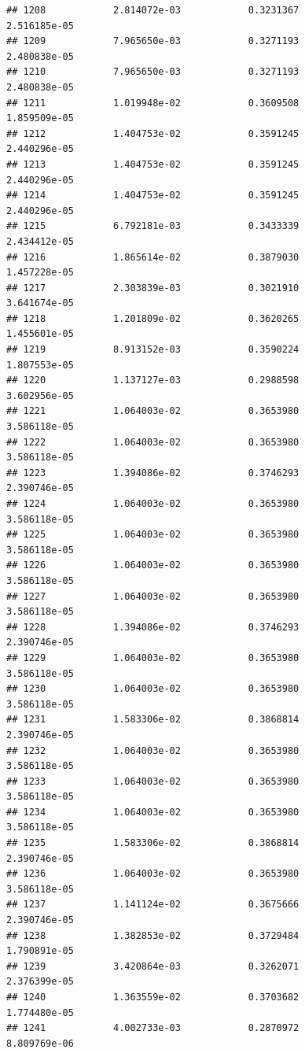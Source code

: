 \documentclass[
]{article}
\begin{document}
\begin{verbatim}
## 1208            2.814072e-03            0.3231367            2.516185e-05
## 1209            7.965650e-03            0.3271193            2.480838e-05
## 1210            7.965650e-03            0.3271193            2.480838e-05
## 1211            1.019948e-02            0.3609508            1.859509e-05
## 1212            1.404753e-02            0.3591245            2.440296e-05
## 1213            1.404753e-02            0.3591245            2.440296e-05
## 1214            1.404753e-02            0.3591245            2.440296e-05
## 1215            6.792181e-03            0.3433339            2.434412e-05
## 1216            1.865614e-02            0.3879030            1.457228e-05
## 1217            2.303839e-03            0.3021910            3.641674e-05
## 1218            1.201809e-02            0.3620265            1.455601e-05
## 1219            8.913152e-03            0.3590224            1.807553e-05
## 1220            1.137127e-03            0.2988598            3.602956e-05
## 1221            1.064003e-02            0.3653980            3.586118e-05
## 1222            1.064003e-02            0.3653980            3.586118e-05
## 1223            1.394086e-02            0.3746293            2.390746e-05
## 1224            1.064003e-02            0.3653980            3.586118e-05
## 1225            1.064003e-02            0.3653980            3.586118e-05
## 1226            1.064003e-02            0.3653980            3.586118e-05
## 1227            1.064003e-02            0.3653980            3.586118e-05
## 1228            1.394086e-02            0.3746293            2.390746e-05
## 1229            1.064003e-02            0.3653980            3.586118e-05
## 1230            1.064003e-02            0.3653980            3.586118e-05
## 1231            1.583306e-02            0.3868814            2.390746e-05
## 1232            1.064003e-02            0.3653980            3.586118e-05
## 1233            1.064003e-02            0.3653980            3.586118e-05
## 1234            1.064003e-02            0.3653980            3.586118e-05
## 1235            1.583306e-02            0.3868814            2.390746e-05
## 1236            1.064003e-02            0.3653980            3.586118e-05
## 1237            1.141124e-02            0.3675666            2.390746e-05
## 1238            1.382853e-02            0.3729484            1.790891e-05
## 1239            3.420864e-03            0.3262071            2.376399e-05
## 1240            1.363559e-02            0.3703682            1.774480e-05
## 1241            4.002733e-03            0.2870972            8.809769e-06

\end{verbatim}
\end{document}
